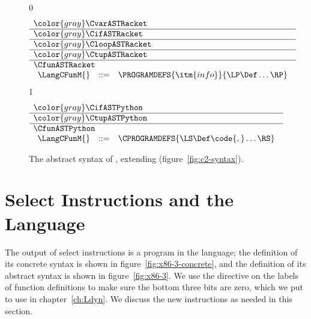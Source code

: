 \documentclass[7x10]{TimesAPriori_MIT}%
\newcommand{\gray}[1]{{\color{gray} #1}}
\def\racketEd{0}
\def\pythonEd{1}
\def\edition{1}
\newcommand{\pythonColor}[0]{}
\numberwithin{theorem}{chapter}
\numberwithin{definition}{chapter}
\numberwithin{equation}{chapter}
\begin{document}
\begin{figure}[tp]
  \begin{tcolorbox}[colback=white]
\small
{\if\edition\racketEd
\[
\begin{array}{l}
  \gray{\CvarASTRacket} \\ \hline
  \gray{\CifASTRacket} \\ \hline
  \gray{\CloopASTRacket} \\ \hline
  \gray{\CtupASTRacket} \\ \hline
  \CfunASTRacket \\
  \begin{array}{lcl}
  \LangCFunM{} & ::= & \PROGRAMDEFS{\itm{info}}{\LP\Def\ldots\RP} 
  \end{array}
\end{array}
\]
\fi}
{\if\edition\pythonEd\pythonColor
\[
  \begin{array}{l}
  \gray{\CifASTPython} \\ \hline
  \gray{\CtupASTPython} \\ \hline
  \CfunASTPython \\
  \begin{array}{lcl}
    \LangCFunM{} & ::= & \CPROGRAMDEFS{\LS\Def\code{,}\ldots\RS} 
  \end{array}
  \end{array}
\]
\fi}
  \end{tcolorbox}

\caption{The abstract syntax of \LangCFun{}, extending \LangCVec{} (figure~\ref{fig:c2-syntax}).}
\label{fig:c3-syntax}
\end{figure}

\clearpage

\section{Select Instructions and the \LangXIndCall{} Language}
\label{sec:select-r4}

The output of select instructions is a program in the \LangXIndCall{}
language; the definition of its concrete syntax is shown in
figure~\ref{fig:x86-3-concrete}, and the definition of its abstract
syntax is shown in figure~\ref{fig:x86-3}.  We use the 
directive on the labels of function definitions to make sure the
bottom three bits are zero, which we put to use in
chapter~\ref{ch:Ldyn}. We discuss the new instructions as needed in
this section.  

\newcommand{\GrammarXIndCall}{
\begin{array}{lcl}
\Instr &::=&  \key{callq}\;\key{*}\Arg \MID \key{tailjmp}\;\Arg 
     \MID \key{leaq}\;\Arg\key{,}\;\key{\%}\Reg \\
\Block &::= & \Instr^{+} \\
\Def &::= & \code{.globl}\,\code{.align 8}\,\itm{label}\; (\itm{label}\key{:}\, \Block)^{*} 
\end{array}
}
\end{document}
